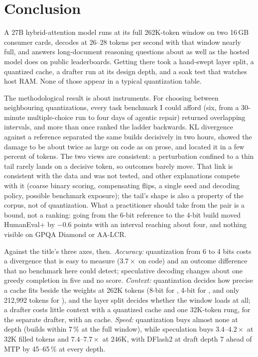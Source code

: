 \section{Conclusion}\label{sec:conclusion}

A 27B hybrid-attention model runs at its full 262K-token window on two 16\,GB consumer cards, decodes
at 26--28 tokens per second with that window nearly full, and answers long-document reasoning questions
about as well as the hosted model does on public leaderboards. Getting there took a hand-swept layer
split, a quantized cache, a drafter run at its design depth, and a soak test that watches host RAM.
None of those appear in a typical quantization table.

The methodological result is about instruments. For choosing between neighbouring quantizations, every
task benchmark I could afford (six, from a 30-minute multiple-choice run to four days of
agentic repair) returned overlapping intervals, and more than once ranked the ladder backwards. KL divergence
against a reference separated the same builds decisively in two hours, showed the damage to be about
twice as large on code as on prose, and located it in a few percent of tokens. The two views are
consistent: a perturbation confined to a thin tail rarely lands on a decisive token, so outcomes barely
move. That link is consistent with the data and was not tested, and other explanations compete with it
(coarse binary scoring, compensating flips, a single seed and decoding policy, possible benchmark exposure); the tail's shape is also a property of
the corpus, not of quantization. What a practitioner should take from the pair is a bound, not a ranking: going from the 6-bit
reference to the 4-bit build moved HumanEval+ by $-0.6$ points with an interval reaching about four, and nothing visible
on GPQA Diamond or AA-LCR.

Against the title's three axes, then. \emph{Accuracy:} quantization from 6 to 4 bits costs a
divergence that is easy to measure ($3.7\times$ on code) and an outcome difference that no benchmark here
could detect; speculative decoding changes about one greedy completion in five and no score.
\emph{Context:} quantization decides how precise a cache fits beside the weights at 262K tokens (8-bit
for \Qfour, 4-bit for \Qsix, and only 212{,}992 tokens for \QsixXL), and the layer split decides whether
the window loads at all; a drafter costs little context with a quantized cache and one 32K-token rung,
for the separate drafter, with an  cache. \emph{Speed:} quantization buys almost none at depth
(builds within 7\,\% at the full window), while speculation buys $3.4$--$4.2\times$ at 32K filled tokens
and $7.4$--$7.7\times$ at 246K, with DFlash2 at draft depth 7 ahead of MTP by 45--65\,\% at every depth.

